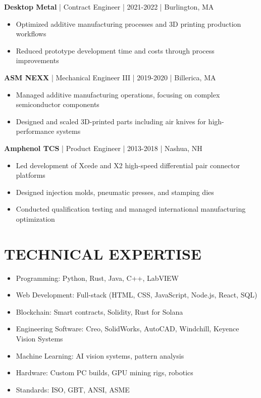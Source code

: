 \documentclass[11pt,letterpaper]{article}
\begin{document}
\textbf{Desktop Metal} | Contract Engineer | 2021-2022 | Burlington, MA
\begin{itemize}[leftmargin=*]
\item Optimized additive manufacturing processes and 3D printing production workflows
\item Reduced prototype development time and costs through process improvements
\end{itemize}

\textbf{ASM NEXX} | Mechanical Engineer III | 2019-2020 | Billerica, MA
\begin{itemize}[leftmargin=*]
\item Managed additive manufacturing operations, focusing on complex semiconductor components
\item Designed and scaled 3D-printed parts including air knives for high-performance systems
\end{itemize}

\textbf{Amphenol TCS} | Product Engineer | 2013-2018 | Nashua, NH
\begin{itemize}[leftmargin=*]
\item Led development of Xcede and X2 high-speed differential pair connector platforms
\item Designed injection molds, pneumatic presses, and stamping dies
\item Conducted qualification testing and managed international manufacturing optimization
\end{itemize}

\section*{TECHNICAL EXPERTISE}
\begin{itemize}[leftmargin=*]
\item Programming: Python, Rust, Java, C++, LabVIEW
\item Web Development: Full-stack (HTML, CSS, JavaScript, Node.js, React, SQL)
\item Blockchain: Smart contracts, Solidity, Rust for Solana
\item Engineering Software: Creo, SolidWorks, AutoCAD, Windchill, Keyence Vision Systems
\item Machine Learning: AI vision systems, pattern analysis
\item Hardware: Custom PC builds, GPU mining rigs, robotics
\item Standards: ISO, GBT, ANSI, ASME
\end{itemize}
\end{document}

